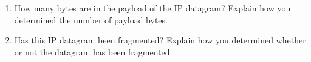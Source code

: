 \begin{enumerate}[label=\bfseries Problem \arabic*:,leftmargin=*,labelindent=1em]
        \item How many bytes are in the payload of the IP datagram? Explain how you determined the number of payload bytes.\\[0.2mm]
        \soln
        \item Has this IP datagram been fragmented? 
        Explain how you determined whether or not the datagram has been fragmented.\\[0.2mm]
        \soln
    \end{enumerate}
\newpage